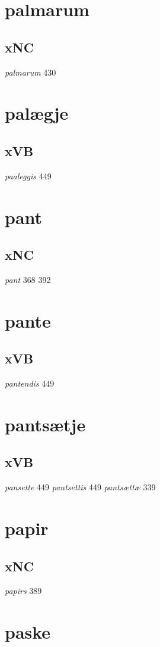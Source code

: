 \documentclass[a4paper,twocolumn]{article}
\begin{document}
\section{palmarum}
\label{sec:org02f0187}
\subsection{xNC}
\label{sec:org87aa416}
\emph{palmarum} 430 
\section{palægje}
\label{sec:org574acc7}
\subsection{xVB}
\label{sec:orgbaee88b}
\emph{paaleggis} 449 
\section{pant}
\label{sec:org1cce9eb}
\subsection{xNC}
\label{sec:orgcc4ddf9}
\emph{pant} 368 392 
\section{pante}
\label{sec:org59db154}
\subsection{xVB}
\label{sec:org2aae829}
\emph{pantendis} 449 
\section{pantsætje}
\label{sec:orgcffef1f}
\subsection{xVB}
\label{sec:orgb8a530c}
\emph{pansette} 449 \emph{pantsettis} 449 \emph{pantsættæ} 339 
\section{papir}
\label{sec:orgab3b47d}
\subsection{xNC}
\label{sec:org7ab3e41}
\emph{papirs} 389 
\section{paske}
\label{sec:org40b97f5}
\end{document}

